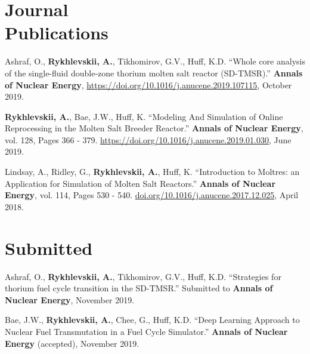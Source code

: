 \documentclass[margin,line]{resume}
\newcommand{\Cyclus}{\textsc{Cyclus}\xspace}%
\begin{document}
\begin{resume}
    \section{\mysidestyle Journal\\Publications}
      \begin{bibenum}
	    \item Ashraf, O., \textbf{Rykhlevskii, A.}, Tikhomirov, G.V., Huff, 
		K.D. ``Whole core analysis of the single-fluid double-zone thorium 
		molten salt reactor (SD-TMSR).'' \textbf{Annals of Nuclear Energy}, 
		\url{https://doi.org/10.1016/j.anucene.2019.107115}, October 2019.
	    \item \textbf{Rykhlevskii, A.}, Bae, J.W., Huff, K. ``Modeling And 
	    Simulation of Online Reprocessing in the Molten Salt Breeder 
	    Reactor.'' \textbf{Annals of Nuclear Energy}, vol. 128, Pages 366 - 379.
               \url{https://doi.org/10.1016/j.anucene.2019.01.030}, June 2019.
       \item Lindsay, A., Ridley, G., \textbf{Rykhlevskii, A.}, Huff, K. ``Introduction to 
               Moltres: an Application for Simulation of Molten Salt 
               Reactors.''  \textbf{Annals of Nuclear Energy}, vol. 114, Pages 
               530 - 540. \url{doi.org/10.1016/j.anucene.2017.12.025}, April 
               2018.
      \end{bibenum}
\vspace{2mm} %
	\section{\mysidestyle Submitted}
	\begin{bibenum}
	    \item Ashraf, O., \textbf{Rykhlevskii, A.}, Tikhomirov, G.V., Huff, 
		K.D. ``Strategies for thorium fuel cycle transition in the SD-TMSR.''
		Submitted to \textbf{Annals of Nuclear Energy}, November 2019.
		\item Bae, J.W., \textbf{Rykhlevskii, A.}, Chee, G., Huff, K.D. ``Deep 
		Learning Approach to Nuclear Fuel Transmutation in a Fuel Cycle 
		Simulator.'' \textbf{Annals of 
		Nuclear Energy} (accepted), November 2019.
	\end{bibenum}

\end{resume}
\end{document}
